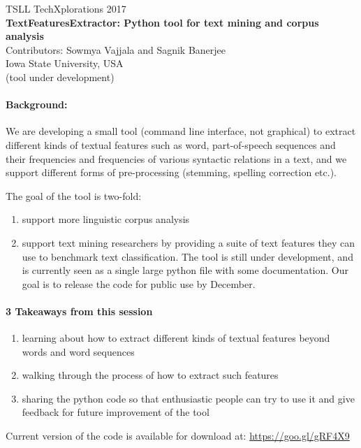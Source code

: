 \documentclass{article}
\begin{document}
\begin{center}
TSLL TechXplorations 2017\\
\textbf{TextFeaturesExtractor: Python tool for text mining and corpus analysis}
\\  Contributors: Sowmya Vajjala and Sagnik Banerjee
\\ Iowa State University, USA
\\ (tool under development)
\end{center}

\paragraph{Background: } We are developing a small tool (command line interface, not graphical) to extract different kinds of textual features such as word, part-of-speech sequences and their frequencies and frequencies of various syntactic relations in a text, and we support different forms of pre-processing (stemming, spelling correction etc.). 

The goal of the tool is two-fold: 
\begin{enumerate}
\item support more linguistic corpus analysis 
\item support text mining researchers by providing a suite of text features they can use to benchmark text classification. 
The tool is still under development, and is currently seen as a single large python file with some documentation. Our goal is to release the code for public use by December.
\end{enumerate}

\paragraph{3 Takeaways from this session}
\begin{enumerate}
\item learning about how to extract different kinds of textual features beyond words and word sequences
\item walking through the process of how to extract such features
\item sharing the python code so that enthusiastic people can try to use it and give feedback for future improvement of the tool
\end{enumerate}

Current version of the code is available for download at: \url{https://goo.gl/gRF4X9}
\end{document}
